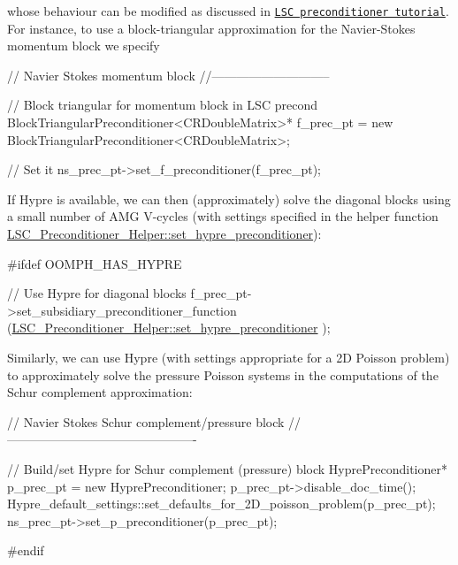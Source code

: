 whose behaviour can be modified as discussed in \href{../../../preconditioners/lsc_navier_stokes/html/index.html}{\tt L\+SC preconditioner tutorial}. For instance, to use a block-\/triangular approximation for the Navier-\/\+Stokes momentum block we specify


\begin{DoxyCodeInclude}

   \textcolor{comment}{// Navier Stokes momentum block}
   \textcolor{comment}{//-----------------------------}

   \textcolor{comment}{// Block triangular for momentum block in LSC precond}
   BlockTriangularPreconditioner<CRDoubleMatrix>*
    f\_prec\_pt = \textcolor{keyword}{new} BlockTriangularPreconditioner<CRDoubleMatrix>;

   \textcolor{comment}{// Set it}
   ns\_prec\_pt->set\_f\_preconditioner(f\_prec\_pt);  

\end{DoxyCodeInclude}


If Hypre is available, we can then (approximately) solve the diagonal blocks using a small number of A\+MG V-\/cycles (with settings specified in the helper function {\ttfamily \hyperlink{namespaceLSC__Preconditioner__Helper_a3191fa949eda009c481fdf4f81516535}{L\+S\+C\+\_\+\+Preconditioner\+\_\+\+Helper\+::set\+\_\+hypre\+\_\+preconditioner}})\+:


\begin{DoxyCodeInclude}
   
\textcolor{preprocessor}{#ifdef OOMPH\_HAS\_HYPRE}

   \textcolor{comment}{// Use Hypre for diagonal blocks}
   f\_prec\_pt->set\_subsidiary\_preconditioner\_function
    (\hyperlink{namespaceLSC__Preconditioner__Helper_a3191fa949eda009c481fdf4f81516535}{LSC\_Preconditioner\_Helper::set\_hypre\_preconditioner}
      );

\end{DoxyCodeInclude}


Similarly, we can use Hypre (with settings appropriate for a 2D Poisson problem) to approximately solve the pressure Poisson systems in the computations of the Schur complement approximation\+:


\begin{DoxyCodeInclude}


   \textcolor{comment}{// Navier Stokes Schur complement/pressure block}
   \textcolor{comment}{//----------------------------------------------}

   \textcolor{comment}{// Build/set Hypre for Schur complement (pressure) block}
   HyprePreconditioner* p\_prec\_pt = \textcolor{keyword}{new} HyprePreconditioner;
   p\_prec\_pt->disable\_doc\_time();   
   Hypre\_default\_settings::set\_defaults\_for\_2D\_poisson\_problem(p\_prec\_pt);   
   ns\_prec\_pt->set\_p\_preconditioner(p\_prec\_pt); 

\textcolor{preprocessor}{#endif}

\end{DoxyCodeInclude}


